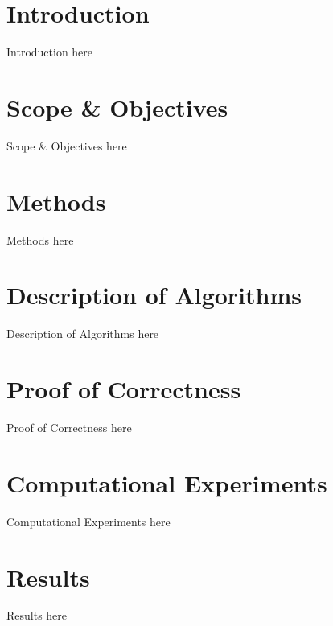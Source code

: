 \documentclass[twoside]{article}
\begin{document}
\begin{multicols}{2} %

\section{Introduction}

Introduction here


\section{Scope \& Objectives}

Scope \& Objectives here

\section{Methods}

Methods here

\section{Description of Algorithms}

Description of Algorithms here

\section{Proof of Correctness}

Proof of Correctness here

\section{Computational Experiments}

Computational Experiments here

\section{Results}

Results here


\end{multicols}
\end{document}

